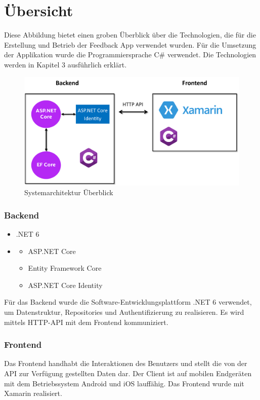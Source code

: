 \section{Übersicht}

Diese Abbildung bietet einen groben Überblick über die Technologien, die für die Erstellung und Betrieb der Feedback App verwendet wurden.
Für die Umsetzung der Applikation wurde die Programmiersprache C\# verwendet. Die Technologien werden in Kapitel 3 ausführlich erklärt.

\begin{figure} [h]
    \includegraphics*[width=15cm]{./pics/architecture_overview.png}
    \caption[overview architecture]{Systemarchitektur Überblick \cite{CSharpLogo} \cite{XamarinLogo}}
\end{figure}

\subsubsection{Backend}
\begin{itemize}
    \item .NET 6
    \item \begin{itemize}
        \item ASP.NET Core
        \item Entity Framework Core
        \item ASP.NET Core Identity
    \end{itemize}
\end{itemize}

Für das Backend wurde die Software-Entwicklungsplattform .NET 6 verwendet, um Datenstruktur, Repositories und Authentifizierung zu realisieren. 
Es wird mittels HTTP-API mit dem Frontend kommuniziert.

\subsubsection{Frontend}
Das Frontend handhabt die Interaktionen des Benutzers und stellt die von der API zur Verfügung gestellten Daten dar. Der Client ist auf mobilen Endgeräten 
mit dem Betriebssystem Android und iOS lauffähig. Das Frontend wurde mit Xamarin realisiert.

